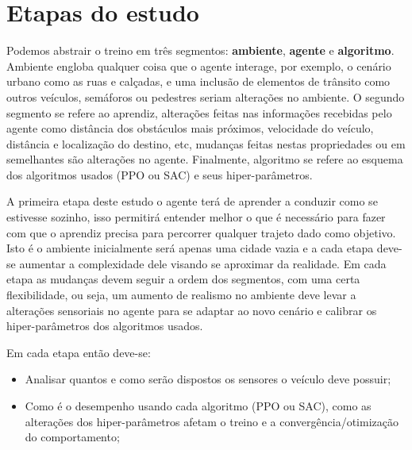 \section*{Etapas do estudo}\label{sec:etapas}
Podemos abstrair o treino em três segmentos: \textbf{ambiente}, \textbf{agente} e \textbf{algoritmo}. Ambiente engloba qualquer coisa que o agente interage, por exemplo, o cenário urbano como as ruas e calçadas, e uma inclusão de elementos de trânsito como outros veículos, semáforos ou pedestres seriam alterações no ambiente. O segundo segmento se refere ao aprendiz, alterações feitas nas informações recebidas pelo agente como distância dos obstáculos mais próximos, velocidade do veículo, distância e localização do destino, etc, mudanças feitas nestas propriedades ou em semelhantes são alterações no agente. Finalmente, algoritmo se refere ao esquema dos algoritmos usados (PPO ou SAC) e seus hiper-parâmetros.

A primeira etapa deste estudo o agente terá de aprender a conduzir como se estivesse sozinho, isso permitirá entender melhor o que é necessário para fazer com que o aprendiz precisa para percorrer qualquer trajeto dado como objetivo. Isto é o ambiente inicialmente será apenas uma cidade vazia e a cada etapa deve-se aumentar a complexidade dele visando se aproximar da realidade. Em cada etapa as mudanças devem seguir a ordem dos segmentos, com uma certa flexibilidade, ou seja, um aumento de realismo no ambiente deve levar a alterações sensoriais no agente para se adaptar ao novo cenário e calibrar os hiper-parâmetros dos algoritmos usados.

Em cada etapa então deve-se:
\begin{itemize}
    \item Analisar quantos e como serão dispostos os sensores o veículo deve possuir;
    \item Como é o desempenho usando cada algoritmo (PPO ou SAC), como as alterações dos hiper-parâmetros afetam o treino e a convergência/otimização do comportamento;
\end{itemize}